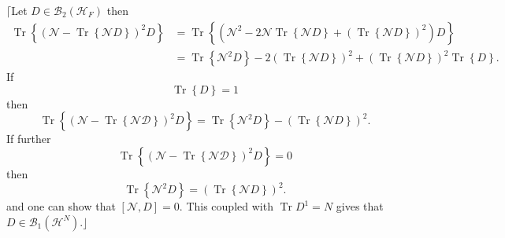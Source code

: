 \documentclass[aps,preprint]{revtex4}%
\begin{document}
$\lceil$Let $D\in\mathcal{B}_{2}\left(  \mathcal{H}_{F}\right)  $ then
\begin{align}
\operatorname{Tr}\left\{  \left(  \mathcal{N}-\operatorname{Tr}\left\{
\mathcal{N}D\right\}  \right)  ^{2}D\right\}   &  =\operatorname{Tr}\left\{
\left(  \mathcal{N}^{2}-2\mathcal{N}\operatorname{Tr}\left\{  \mathcal{N}%
D\right\}  +\left(  \operatorname{Tr}\left\{  \mathcal{N}D\right\}  \right)
^{2}\right)  D\right\} \nonumber\\
&  =\operatorname{Tr}\left\{  \mathcal{N}^{2}D\right\}  -2\left(
\operatorname{Tr}\left\{  \mathcal{N}D\right\}  \right)  ^{2}+\left(
\operatorname{Tr}\left\{  \mathcal{N}D\right\}  \right)  ^{2}\operatorname{Tr}%
\left\{  D\right\}  .
\end{align}
If
\begin{equation}
\operatorname{Tr}\left\{  D\right\}  =1
\end{equation}
then
\begin{equation}
\operatorname{Tr}\left\{  \left(  \mathcal{N}-\operatorname{Tr}\left\{
\mathcal{ND}\right\}  \right)  ^{2}D\right\}  =\operatorname{Tr}\left\{
\mathcal{N}^{2}D\right\}  -\left(  \operatorname{Tr}\left\{  \mathcal{N}%
D\right\}  \right)  ^{2}.
\end{equation}
If further
\begin{equation}
\operatorname{Tr}\left\{  \left(  \mathcal{N}-\operatorname{Tr}\left\{
\mathcal{ND}\right\}  \right)  ^{2}D\right\}  =0
\end{equation}
then
\begin{equation}
\operatorname{Tr}\left\{  \mathcal{N}^{2}D\right\}  =\left(  \operatorname{Tr}%
\left\{  \mathcal{N}D\right\}  \right)  ^{2}.
\end{equation}
and one can show that $\left[  \mathcal{N},D\right]  =0.$ This coupled with
$\operatorname{Tr}D^{1}=N$ gives that $D\in\mathcal{B}_{1}\left(
\mathcal{H}^{N}\right)  .\rfloor$
\end{document}
